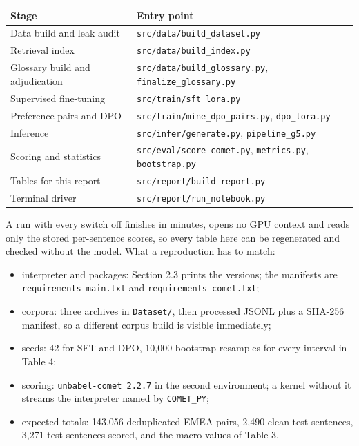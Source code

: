 \documentclass[a4paper,12pt,oneside]{article}
\begin{document}
\begin{center}\small
\begin{tabular}{ll}
\toprule
Stage & Entry point \\
\midrule
Data build and leak audit & \texttt{src/data/build\_dataset.py} \\
Retrieval index & \texttt{src/data/build\_index.py} \\
Glossary build and adjudication & \texttt{src/data/build\_glossary.py}, \texttt{finalize\_glossary.py} \\
Supervised fine-tuning & \texttt{src/train/sft\_lora.py} \\
Preference pairs and DPO & \texttt{src/train/mine\_dpo\_pairs.py}, \texttt{dpo\_lora.py} \\
Inference & \texttt{src/infer/generate.py}, \texttt{pipeline\_g5.py} \\
Scoring and statistics & \texttt{src/eval/score\_comet.py}, \texttt{metrics.py}, \texttt{bootstrap.py} \\
Tables for this report & \texttt{src/report/build\_report.py} \\
Terminal driver & \texttt{src/report/run\_notebook.py} \\
\bottomrule
\end{tabular}
\end{center}

A run with every switch off finishes in minutes, opens no GPU context and reads only the stored
per-sentence scores, so every table here can be regenerated and checked without the model. What a
reproduction has to match:

\begin{itemize}\setlength{\itemsep}{2pt}
  \item interpreter and packages: Section 2.3 prints the versions; the manifests are
        \texttt{requirements-main.txt} and \texttt{requirements-comet.txt};
  \item corpora: three archives in \texttt{Dataset/}, then processed JSONL plus a SHA-256 manifest,
        so a different corpus build is visible immediately;
  \item seeds: 42 for SFT and DPO, 10,000 bootstrap resamples for every interval in Table 4;
  \item scoring: \texttt{unbabel-comet 2.2.7} in the second environment; a kernel without it streams
        the interpreter named by \texttt{COMET\_PY};
  \item expected totals: 143,056 deduplicated EMEA pairs, 2,490 clean test sentences, 3,271 test
        sentences scored, and the macro values of Table 3.
\end{itemize}
\end{document}
